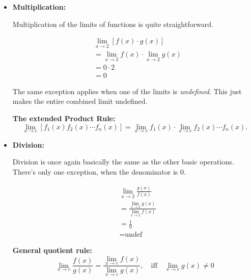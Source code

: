 \documentclass[12pt]{article}
\begin{document}
\begin{itemize}
                \item \textbf{Multiplication:}

                    Multiplication of the limits of functions is quite straightforward.

                    \begin{align*}
                        &\lim_{x \to 2} \left[ f(x) \cdot g(x) \right] \\
                        &= \lim_{x \to 2} f(x) \cdot \lim_{x \to 2} g(x) \\
                        &= 0 \cdot 2 \\
                        &= 0
                    \end{align*}

                    \indent The same exception applies when one of the limits is \textit{undefined}. This just makes the entire combined limit undefined.

                    \noindent\textbf{The extended Product Rule:}
                    \begin{equation*}
                        \lim_{x \to c} \left[ f_1(x) f_2(x) \cdots f_n(x) \right]
                        = \lim_{x \to c} f_1(x) \cdot \lim_{x \to c} f_2(x)
                        \cdots f_n(x).
                    \end{equation*}
                    \smallskip

                \item \textbf{Division:}

                    Division is once again basically the same as the other basic operations. There's only one exception, when the denominator is $0$.

                    \begin{align*}
                        &\lim_{x \to 2} \frac{g(x)}{f(x)} \\
                        &= \frac{\lim_{x \to 2} g(x)}{\lim_{x \to 2} f(x)} \\
                        &= \frac{1}{0} \\
                        &= \text{undef}
                    \end{align*}

                    \noindent\textbf{General quotient rule:}
                    \[ \lim_{x \to c} \frac{f(x)}{g(x)} = \frac{\lim_{x \to c} f(x)}{\lim_{x \to c} g(x)}, \quad \textrm{iff} \quad \lim_{x \to c} g(x) \ne 0 \]
                    \smallskip


\end{itemize}
\end{document}
